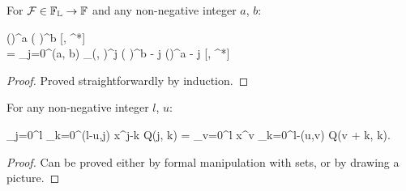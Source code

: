 \begin{lemma}
\label{lmm:transformations:swap-differential}
    For $\mathcal{F} \in \mathbb{F}_{\mathbb{L}} \rightarrow \mathbb{F}$ and any non-negative integer $a$, $b$:
    \begin{eqn*}
    	\Psi(\xvec)^a \left( \frac{\delta}{\delta \Psi(\xvec)} \right)^b [\Psi, \Psi^*] \\
    	= \sum_{j=0}^{\min(a, b)}
    		 
    		\delta_{\restbasis}(\xvec, \xvec)^j
    		\left( \frac{\delta}{\delta \Psi(\xvec)} \right)^{b - j}
    		\Psi(\xvec)^{a - j}
    		[\Psi, \Psi^*]
    \end{eqn*}
\end{lemma}
\begin{proof}
Proved straightforwardly by induction.
\end{proof}

\begin{lemma}
\label{lmm:transformations:sum-rearrangement}
    For any non-negative integer $l$, $u$:
    \begin{eqn*}
    	\sum_{j=0}^l \sum_{k=0}^{\min(l-u,j)} x^{j-k} Q(j, k)
    	= \sum_{v=0}^l x^v \sum_{k=0}^{l-\max(u,v)} Q(v + k, k).
    \end{eqn*}
\end{lemma}
\begin{proof}
Can be proved either by formal manipulation with sets, or by drawing a picture.
\end{proof}

